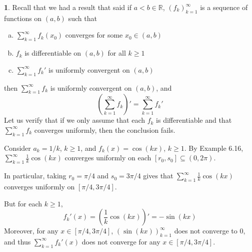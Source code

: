 \documentclass[11pt]{article}
\theoremstyle{definition}
\newtheorem{none}[thm]{}
\newcommand{\mbR}{\ensuremath{\mathbb{R}}}
\begin{document}
\begin{none}
Recall that we had a result that said if $a < b \in \mbR$, $(f_k)_{k=1}^\infty$ is a sequence of functions on $(a, b)$ such that
\begin{enumerate}[(a)] \vspace{-0.2cm}
\item $\sum_{k=1}^\infty f_k(x_0)$ converges for some $x_0 \in (a, b)$
\item $f_k$ is differentiable on $(a, b)$ for all $k \geq 1$
\item $\sum_{k=1}^\infty f_k'$ is uniformly convergent on $(a, b)$
\end{enumerate}
then $\sum_{k=1}^\infty f_k$ is uniformly convergent on $(a, b)$, and
$$\left(\sum_{k=1}^\infty f_k\right)' = \sum_{k=1}^\infty f_k'$$
Let us verify that if we only assume that each $f_k$ is differentiable and that $\sum_{k=1}^\infty f_k$ converges uniformly, then the conclusion fails.

Consider $a_k = 1/k$, $k \geq 1$, and $f_k(x) = \cos(kx)$, $k \geq 1$. By Example 6.16, $\sum_{k=1}^\infty \frac1k\cos(kx)$ converges uniformly on each $[r_0, s_0] \subseteq (0, 2\pi)$.

In particular, taking $r_0 = \pi/4$ and $s_0 = 3\pi/4$ gives that $\sum_{k=1}^\infty \frac1k\cos(kx)$ converges uniformly on $[\pi/4, 3\pi/4]$.

But for each $k \geq 1$,
$$f_k'(x) = \left( \frac1k \cos(kx) \right)' = -\sin(kx)$$
Moreover, for any $x \in [\pi/4, 3\pi/4]$, $\left(\sin(kx)\right)_{k=1}^\infty$ does not converge to 0, and thus $\sum_{k=1}^\infty f_k'(x)$ does not converge for any $x \in [\pi/4, 3\pi/4]$.
\end{none}
\end{document}
